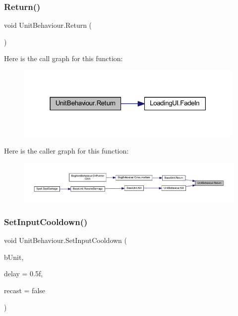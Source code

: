 \subsubsection{\texorpdfstring{Return()}{Return()}}
{\footnotesize\ttfamily void Unit\+Behaviour.\+Return (\begin{DoxyParamCaption}{ }\end{DoxyParamCaption})}

Here is the call graph for this function\+:
\nopagebreak
\begin{figure}[H]
\begin{center}
\leavevmode
\includegraphics[width=315pt]{class_unit_behaviour_a4b2664ef7a33e795220d587cb789d169_cgraph}
\end{center}
\end{figure}
Here is the caller graph for this function\+:
\nopagebreak
\begin{figure}[H]
\begin{center}
\leavevmode
\includegraphics[width=350pt]{class_unit_behaviour_a4b2664ef7a33e795220d587cb789d169_icgraph}
\end{center}
\end{figure}
\mbox{\label{class_unit_behaviour_aa4e86ce34131fe81ecef7a56855f8d94}} 
\subsubsection{\texorpdfstring{SetInputCooldown()}{SetInputCooldown()}}
{\footnotesize\ttfamily void Unit\+Behaviour.\+Set\+Input\+Cooldown (\begin{DoxyParamCaption}\item[{\mbox{\hyperlink{class_base_unit}{Base\+Unit}}}]{b\+Unit,  }\item[{float}]{delay = {\ttfamily 0.5f},  }\item[{bool}]{recast = {\ttfamily false} }\end{DoxyParamCaption})}

